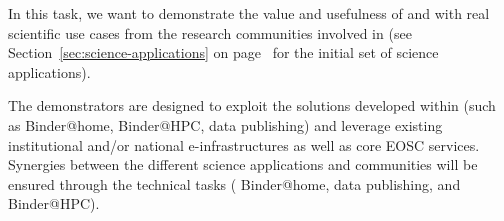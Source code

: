 \begin{task}[
  title=Science demonstrators,
  id=demos,
  lead=MP,
  PM=8,
  partners={IFR,UIO}
]
In this task, we want to demonstrate the value and usefulness of
 and  with real scientific use cases from
the research communities involved in \TheProject (see
Section~\ref{sec:science-applications} on
page~\pageref{sec:science-applications} for the initial set of science applications).

The demonstrators are designed 
to exploit the solutions developed within \TheProject (such as Binder@home, Binder@HPC,
data publishing) and leverage existing institutional and/or national
e-infrastructures as well as core EOSC services. Synergies between the different
science applications and communities will be ensured through the technical tasks
( Binder@home,
 data publishing, and
 Binder@HPC).




 




\end{task}
